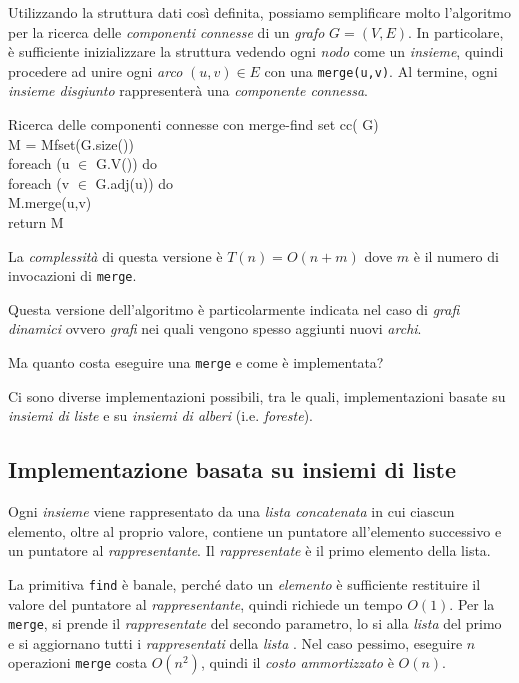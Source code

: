 \noindent
Utilizzando la struttura dati così definita, possiamo semplificare molto
l'algoritmo per la ricerca delle \emph{componenti connesse} di un \emph{grafo}
$G=(V,E)$. In particolare, è sufficiente inizializzare la struttura vedendo ogni
\emph{nodo} come un \emph{insieme}, quindi procedere ad unire ogni \emph{arco}
$(u,v)\in E$ con una \texttt{merge(u,v)}. Al termine, ogni \emph{insieme
disgiunto} rappresenterà una \emph{componente connessa}.

\begin{minicode}{Ricerca delle componenti connesse con merge-find set}
    \ind{} cc( G)\\
         M = Mfset(G.size())\\
        \indf foreach (u $\in$ G.V()) do\\
            \indff foreach (v $\in$ G.adj(u)) do\\
                M.merge(u,v)\\
        \indf return M
\end{minicode}\noindent
La \emph{complessità} di questa versione è $T(n)=O(n+m)$ dove $m$ è il numero di
invocazioni di \texttt{merge}.

\begin{note}
    Questa versione dell'algoritmo è particolarmente indicata nel caso di
    \emph{grafi dinamici} ovvero \emph{grafi} nei quali vengono spesso aggiunti
    nuovi \emph{archi}.
\end{note}

\bigskip\noindent
Ma quanto costa eseguire una \texttt{merge} e come è implementata?

Ci sono diverse implementazioni possibili, tra le quali, implementazioni basate
su \emph{insiemi di liste} e su \emph{insiemi di alberi} (i.e. \emph{foreste}).

\subsection{Implementazione basata su insiemi di liste}
Ogni \emph{insieme} viene rappresentato da una \emph{lista concatenata} in cui
ciascun elemento, oltre al proprio valore, contiene un puntatore all'elemento
successivo e un puntatore al \emph{rappresentante}. Il \emph{rappresentate} è
il primo elemento della lista.

La primitiva \texttt{find} è banale, perché dato un \emph{elemento} è sufficiente
restituire il valore del puntatore al \emph{rappresentante}, quindi richiede un
tempo $O(1)$. Per la \texttt{merge}, si prende il \emph{rappresentate} del secondo
parametro, lo si  alla \emph{lista} del primo e si aggiornano tutti i
\emph{rappresentati} della \emph{lista} . Nel caso pessimo, eseguire
$n$ operazioni \texttt{merge} costa $O(n^2)$, quindi il \emph{costo ammortizzato}
è $O(n)$.

